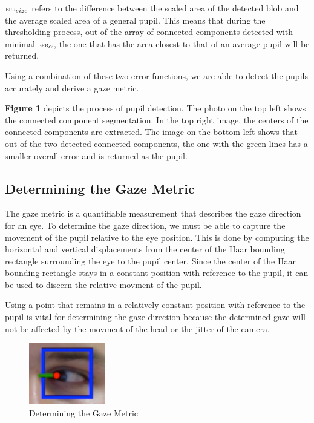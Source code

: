 \documentclass[annual]{acmsiggraph}
\newcommand{\Function}[1]{\ensuremath{{\small \textsc{#1}}}}
\begin{document}
$\Function{err}_{size}$ refers to the difference between the scaled area of the
detected blob and the average scaled area of a general pupil. This means that
during the thresholding process, out of the  array of connected components
detected with minimal $\Function{err}_{\alpha}$, the one that has the area
closest to that of an average pupil will be returned.

Using a combination of these two error functions, we are able to detect the
pupils accurately and derive a gaze metric.

\textbf{Figure 1} depicts the process of pupil detection. The photo on the top
left shows the connected component segmentation. In the top right image, the
centers of the connected components are extracted. The image on the bottom left
shows that out of the two detected connected components, the one with the green
lines has a smaller overall error and is returned as the pupil.

\subsection{Determining the Gaze Metric}

The gaze metric is a quantifiable measurement that describes the gaze direction
for an eye. To determine the gaze direction, we must be able to capture the
movement of the pupil relative to the eye position. This is done by computing
the horizontal and vertical displacements from the center of the Haar bounding
rectangle surrounding the eye to the pupil center. Since the center of the Haar
bounding rectangle stays in a constant position with reference to the pupil, it
can be used to discern the relative movment of the pupil.

Using a point that remains in a relatively constant position with reference to
the pupil is vital for determining the gaze direction because the determined
gaze will not be affected by the movment of the head or the jitter of the
camera.

\begin{figure}[ht]

    \centering

    \includegraphics[width=1.3in]{figs/gazePrediction.pdf}

    \caption{Determining the Gaze Metric}

\end{figure}
\end{document}
